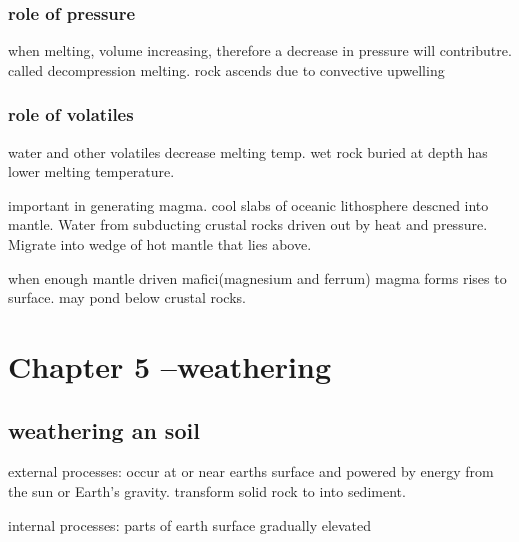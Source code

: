 \documentclass[11pt]{amsart}
\begin{document}
  \subsubsection{role of pressure}
  \par when melting, volume increasing, therefore a decrease in
  pressure will contributre. called decompression melting. rock ascends
  due to convective upwelling
  \subsubsection{role of volatiles}
  \par water and other volatiles decrease melting temp. wet rock buried at
  depth has lower melting temperature.
  \par important in generating magma. cool slabs of oceanic lithosphere descned
  into mantle. Water from subducting crustal rocks  driven out by heat and
  pressure. Migrate into wedge of hot mantle that lies above.
  \par when enough mantle driven mafici(magnesium and ferrum) magma forms rises
  to surface. may pond below crustal rocks.
  \section{Chapter 5 --weathering}
  \subsection{weathering an soil}
  \par external processes: occur at or near earths surface and powered by
  energy from the sun or Earth's gravity. transform solid rock to into
  sediment.
  \par internal processes: parts of earth surface gradually elevated
\end{document}
